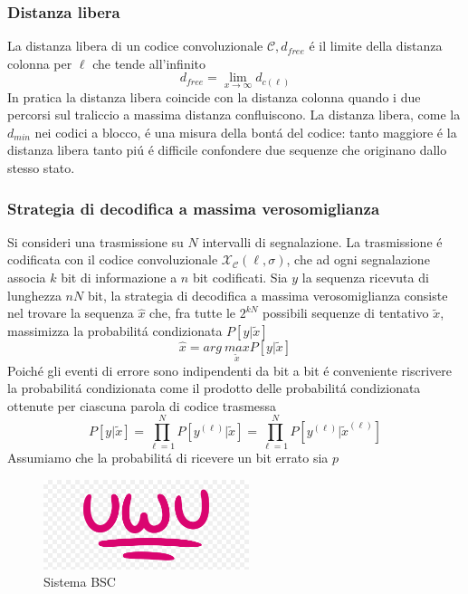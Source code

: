         \subsubsection{Distanza libera}
            La distanza libera di un codice convoluzionale $\mathcal{C},d_{free}$ é il limite della distanza colonna per $\ell$ che tende 
            all'infinito
            \[
                d_{free} = \lim_{x\rightarrow \infty} d_{c(\ell)}  
            \]
            In pratica la distanza libera coincide con la distanza colonna quando i due percorsi sul traliccio a massima distanza confluiscono.
            La distanza libera, come la $d_{min}$ nei codici a blocco, é una misura della bontá del codice: tanto maggiore é la distanza libera 
            tanto piú é difficile confondere due sequenze che originano dallo stesso stato.
        \subsubsection{Strategia di decodifica a massima verosomiglianza}
            Si consideri una trasmissione su $N$ intervalli di segnalazione. La trasmissione é codificata con il codice convoluzionale 
            $\mathcal{X}_\mathcal{C}(\ell,\sigma)$, che ad ogni segnalazione associa $k$ bit di informazione a $n$ bit codificati. Sia 
            $y$ la sequenza ricevuta di lunghezza $nN$ bit, la strategia di decodifica a massima verosomiglianza consiste nel trovare 
            la sequenza $\hat{x}$ che, fra tutte le $2^{kN}$ possibili sequenze di tentativo $\tilde{x}$, massimizza la probabilitá 
            condizionata $P[y|\tilde{x}]$
            \[
                \hat{x} = arg\ \underset{\tilde{x}}{max}P[y|\tilde{x}]   
            \]
            Poiché gli eventi di errore sono indipendenti da bit a bit é conveniente riscrivere la probabilitá condizionata come il 
            prodotto delle probabilitá condizionata ottenute per ciascuna parola di codice trasmessa
            \[
                P[y|\tilde{x}] = \prod_{\ell=1}^{N}P\left[y^{(\ell)}|\tilde{x}\right] = \prod_{\ell=1}^{N}P\left[y^{(\ell)}|\tilde{x}^{(\ell)}\right]  
            \]\label{eventi indipendenti}
            Assumiamo che la probabilitá di ricevere un bit errato sia $p$
            \begin{figure}[H]
                \centering
                \includegraphics[width = 6cm]{media/uwu.png}
                \caption{Sistema BSC}
            \end{figure}
